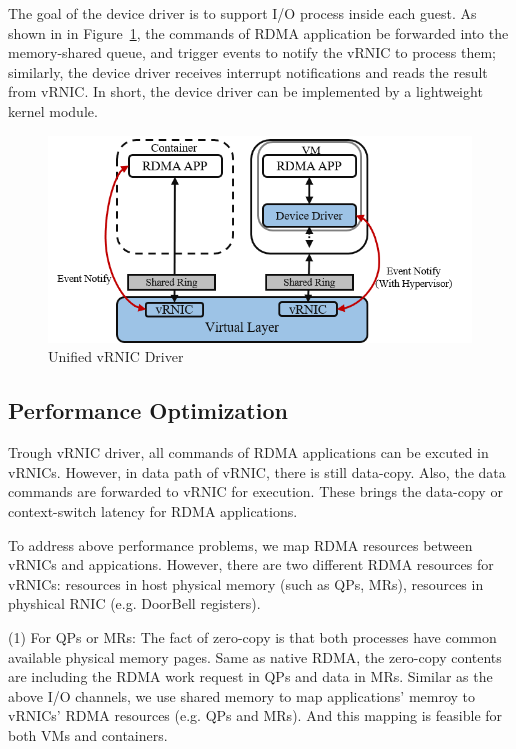 The goal of the device driver is to support I/O process inside each guest. As shown in in Figure~\ref{fig:vrnic-driver},  the commands of RDMA application be forwarded into the memory-shared queue, and trigger events to notify the vRNIC to process them; similarly, the device driver receives interrupt notifications and reads the result from vRNIC. In short, the device driver can be implemented by a lightweight kernel module.

\begin{figure}[!ht]
\centering
\includegraphics[width=1.0\linewidth]{images/interface-general}
\caption{Unified vRNIC Driver}
\label{fig:vrnic-driver}
\end{figure}

	
\subsection{Performance Optimization}
Trough vRNIC driver, all commands of RDMA applications can be excuted in vRNICs. However, in data path of vRNIC, there is still data-copy. Also, the data commands are forwarded to vRNIC for execution. These brings the data-copy or context-switch latency for RDMA applications. 

To address above performance problems, we map RDMA resources between vRNICs and appications. However, there are two different RDMA resources for vRNICs: resources in host physical memory (such as QPs, MRs), resources in physhical RNIC (e.g. DoorBell registers). 

(1) For QPs or MRs: The fact of zero-copy is that both processes have common available physical memory pages. Same as native RDMA, the zero-copy contents are including the RDMA work request in QPs and data in MRs. 
Similar as the above I/O channels, we use shared memory to map applications' memroy to vRNICs' RDMA resources (e.g. QPs and MRs). And this mapping is feasible for both VMs and containers.

